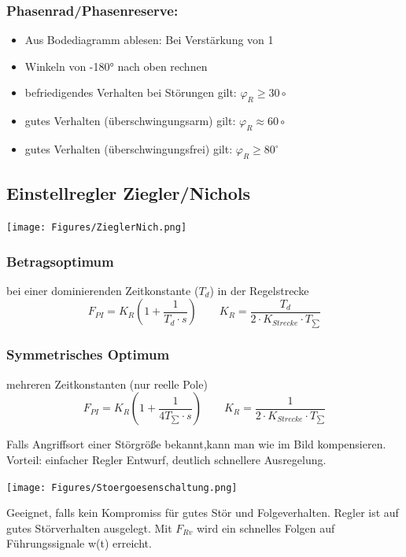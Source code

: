 \subsubsection{Phasenrad/Phasenreserve:}

\begin{itemize}[leftmargin=*]
	\item[] Aus Bodediagramm ablesen: Bei Verstärkung von 1
	\item[] Winkeln von -180° nach oben rechnen
	\item befriedigendes Verhalten bei Störungen gilt: $\varphi _R \geq 30\circ$
	\item gutes Verhalten (überschwingungsarm) gilt: $\varphi _R \approx  60\circ$
	\item gutes Verhalten (überschwingungsfrei) gilt: $\varphi _R \geq 80^\circ$
\end{itemize}

\subsection{Einstellregler Ziegler/Nichols}
{\centering
\texttt{[image: Figures/ZieglerNich.png]}}

\subsubsection{Betragsoptimum}
bei einer dominierenden  Zeitkonstante ($T_d$) in der Regelstrecke
\[
	F_{PI} = K_R \left(1 + \dfrac{1}{T_d \cdot s}\right) \qquad K_R =\dfrac{T_d}{2 \cdot K_{Strecke} \cdot T_{\sum}}
\]

\subsubsection{Symmetrisches Optimum}
mehreren Zeitkonstanten (nur reelle Pole)
\[
	F_{PI} = K_R \left(1 + \dfrac{1}{4T_{\sum} \cdot s}\right) \qquad K_R =\dfrac{1}{2 \cdot K_{Strecke} \cdot T_{\sum}}
\]

\raggedright
\begin{mdframed}[style=exercise, frametitle=Störgrößenaufschaltung:]
	Falls Angriffsort einer Störgröße bekannt,kann man wie im Bild kompensieren.
	Vorteil: einfacher Regler Entwurf, deutlich schnellere Ausregelung.
\end{mdframed}

\texttt{[image: Figures/Stoergoesenschaltung.png]}


\begin{mdframed}[style=exercise, frametitle=Vorsteuerung:]
	Geeignet, falls kein Kompromiss für gutes Stör und Folgeverhalten.
	Regler ist auf gutes Störverhalten ausgelegt. Mit $F_{Rv}$ wird ein schnelles Folgen
	auf Führungssignale w(t) erreicht.
\end{mdframed}

